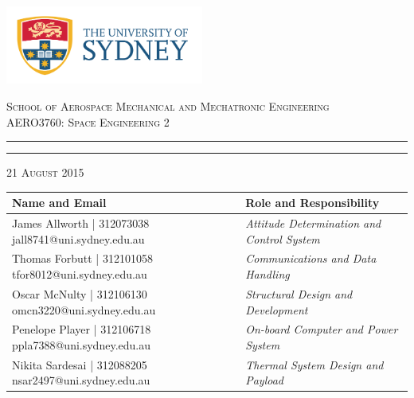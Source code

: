 \begin{titlepage}

\thispagestyle{empty}
\begin{center}
\begin{minipage}{\linewidth}
    \centering
    \includegraphics[width=6.5cm]{logo.png}
    \par
    \vspace{1.2cm}
    {\textsc{School of Aerospace Mechanical and Mechatronic Engineering \\ \vspace{0.3cm}
            AERO3760: Space Engineering 2}}
   \vspace{0.7cm}
	\hrule
    \vspace{1.5cm}
    {{\LARGE{}\par}}

    \vspace{1.5cm}
    \hrule
    \vspace{1.3cm}
     {\large \textsc{21 August 2015}}
\vspace{1.3cm}
    \begin{table}[H]
        \centering
        \vspace{0.2cm}
        \label{tab:maxturbulencealpha}
        {\renewcommand{\arraystretch}{1.7}%
            \begin{tabular}{|>{\centering\arraybackslash}m{6cm}|>{\centering\arraybackslash}m{9cm}|}
                \hline
                \textbf{Name and Email} & \textbf{Role and Responsibility} \\ \hline\hline
                James Allworth | 312073038  jall8741@uni.sydney.edu.au & \textit{Attitude Determination and Control System}  \\\hline
                Thomas Forbutt | 312101058  tfor8012@uni.sydney.edu.au & \textit{Communications and Data Handling}  \\\hline
                Oscar McNulty | 312106130  omcn3220@uni.sydney.edu.au & \textit{Structural Design and Development}  \\\hline
                Penelope Player | 312106718  ppla7388@uni.sydney.edu.au & \textit{On-board Computer and Power System}  \\\hline
                Nikita Sardesai | 312088205  nsar2497@uni.sydney.edu.au & \textit{Thermal System Design and Payload}  \\\hline
                \end{tabular} } 
        \end{table}
    

\end{minipage}
\end{center}
\end{titlepage}
